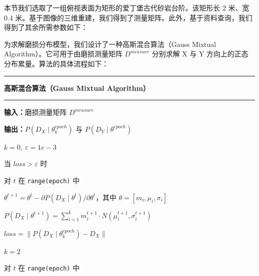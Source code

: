 \documentclass[11pt,a4paper]{ctexart}
\begin{document}
本节我们选取了一组俯视表面为矩形的爱丁堡古代砂岩台阶。该矩形长 2 米、宽 0.4 米。基于图像的三维重建，我们得到了测量矩阵。此外，基于资料查询，我们得到了其余所需参数如下：

为求解磨损分布模型，我们设计了一种高斯混合算法（Gauss Mixtual Algorithm）。它可用于由磨损测量矩阵 \(D^{measure}\) 分别求解 X 与 Y 方向上的正态分布累量。算法的具体流程如下：

\noindent\begin{minipage}{\linewidth}\linespread{1.15}\selectfont
\noindent\rule{\linewidth}{0.5pt}\par\vspace{3pt}
\noindent\textbf{高斯混合算法（Gauss Mixtual Algorithm）}\par\vspace{2pt}
\noindent\rule{\linewidth}{0.3pt}\par\vspace{4pt}
\noindent\textbf{输入：}\quad 磨损测量矩阵 \(D^{measure}\)\par\vspace{3pt}
\noindent\textbf{输出：}\quad \(P(D_X\mid\theta_k^{epoch})\) 与 \(P(D_Y\mid\theta^{epoch})\)\par\vspace{3pt}
\noindent \(k=0,\ \varepsilon=1e-3\)\par\vspace{3pt}
\noindent 当 \(loss>\varepsilon\) 时\par\vspace{2pt}
\hspace*{1.4em}对 \(t\) 在 \texttt{range(epoch)} 中\par\vspace{2pt}
\hspace*{2.8em}\(\theta^{t+1}=\theta^{t}-\partial P(D_X\mid\theta^{t})/\partial\theta^{t}\)，其中 \(\theta=[m_i,\mu_i,\sigma_i]\)\par\vspace{2pt}
\hspace*{2.8em}\(P(D_X\mid\theta^{t+1})=\sum_{i=1}^{k}m_i^{t+1}\cdot N(\mu_i^{t+1},\sigma_i^{t+1})\)\par\vspace{2pt}
\hspace*{1.4em}\(loss=\|P(D_X\mid\theta_k^{epoch})-D_X\|\)\par\vspace{2pt}
\hspace*{1.4em}\(k=2\)\par\vspace{2pt}
\hspace*{1.4em}对 \(t\) 在 \texttt{range(epoch)} 中\par\vspace{2pt}

\end{minipage}
\end{document}
